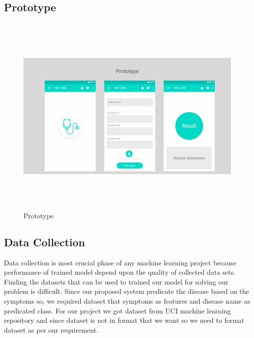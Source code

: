 \subsection{Prototype}
\begin{figure}[H]
\begin{center}
\includegraphics[width=150mm, height = 100mm]{images/prototype.jpg}
\caption{Prototype}
\end{center}
\end{figure}

\subsection{Data Collection}
Data collection is most crucial phase of any machine learning project because performance of trained model depend upon the quality of collected data sets. Finding the datasets that can be used to trained our model for solving our problem is difficult. Since our proposed system predicate the disease based on the symptoms so, we required dataset that symptoms as features and disease name as predicated class. For our project we got dataset from UCI machine learning repository and since dataset is not in format that we want so we need to format dataset as per our requirement.




